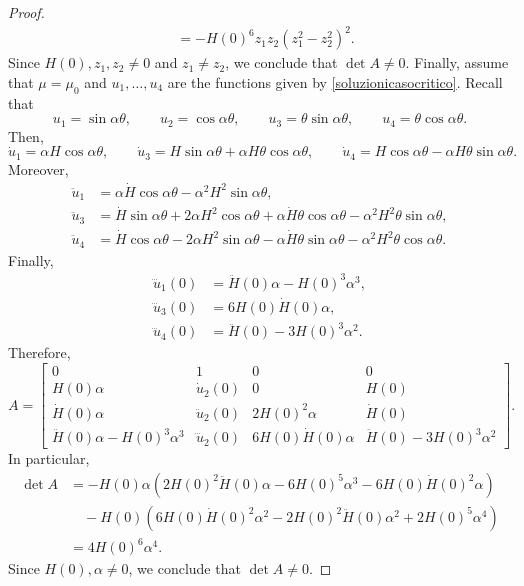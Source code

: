\documentclass[11pt]{amsart}
\theoremstyle{definition}
\theoremstyle{remark}
\numberwithin{equation}{section}
\begin{document}
\begin{proof}
\begin{equation*}
\begin{split}
	&=-H(0)^6z_1z_2\left(z_1^2-z_2^2\right)^2.
\end{split}
\end{equation*}
Since $H(0),z_1,z_2\neq 0$ and $z_1\neq z_2$, we conclude that $\det A\neq 0$. Finally, assume that $\mu=\mu_0$ and $u_1,\ldots,u_4$ are the functions given by \eqref{soluzionicasocritico}. Recall that 
\begin{equation*}
u_1=\sin \alpha \theta,\qquad
u_2=\cos\alpha\theta,\qquad
u_3= \theta\sin\alpha \theta,\qquad
u_4=\theta\cos\alpha\theta.
\end{equation*}
Then,
\begin{equation*}
\dot u_1=\alpha H\cos\alpha\theta,\qquad\dot u_3=H\sin\alpha\theta+\alpha H\theta\cos\alpha\theta,\qquad \dot u_4 =H\cos\alpha\theta-\alpha H\theta\sin\alpha\theta.
\end{equation*}
Moreover,
\begin{align*}
\ddot u_1&=\alpha\dot H\cos\alpha\theta-\alpha^2H^2\sin\alpha\theta,\\
\ddot u_3&=\dot H\sin\alpha\theta+2\alpha H^2\cos\alpha\theta+\alpha\dot H\theta\cos\alpha\theta-\alpha^2 H^2\theta\sin\alpha\theta,\\
\ddot u_4&=\dot H\cos\alpha\theta-2\alpha H^2\sin\alpha\theta-\alpha\dot H\theta\sin\alpha\theta-\alpha^2H^2\theta\cos\alpha\theta.
\end{align*}
Finally,
\begin{align*}
\dddot u_1(0)&=\ddot H(0)\alpha-H(0)^3\alpha^3,\\
\dddot u_3(0)&=6H(0)\dot H(0)\alpha,\\
\dddot u_4(0)&=\ddot H(0)-3H(0)^3\alpha^2.
\end{align*}
Therefore, 
\begin{equation*}
A=\begin{bmatrix}
	0 & 1 & 0 & 0 \\
	H(0)\alpha & \dot u_2(0) & 0 & H(0) \\
	\dot H(0)\alpha & \ddot u_2(0) & 2H(0)^2\alpha & \dot H(0) \\
	\ddot H(0)\alpha-H(0)^3\alpha^3 & \dddot u_2(0) & 6H(0)\dot H(0)\alpha & \ddot H(0)-3H(0)^3\alpha^2
\end{bmatrix}.
\end{equation*}
In particular,
\begin{equation*}
\begin{split}
	\det A&=-H(0)\alpha\left(2H(0)^2\ddot H(0)\alpha-6H(0)^5\alpha^3-6H(0)\dot H(0)^2\alpha\right)\\
	&\quad-H(0)\left(6H(0)\dot H(0)^2\alpha^2-2H(0)^2\ddot H(0)\alpha^2+2H(0)^5\alpha^4\right)\\
	&=4 H(0)^6\alpha^4.
\end{split}
\end{equation*}
Since $H(0),\alpha\neq 0$, we conclude that $\det A\neq 0$.
\end{proof}
\end{document}
